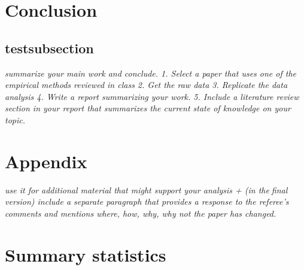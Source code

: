 \documentclass[11pt]{article}
\begin{document}
	\section{ Conclusion}
	\subsection{testsubsection}
	\textit{	summarize your main work and conclude.
		1. Select a paper that uses one of the empirical methods reviewed in class
		2. Get the raw data
		3. Replicate the data analysis
		4. Write a report summarizing your work.
		5. Include a literature review section in your report that summarizes the current state
		of knowledge on your topic.
	}

	
	
	\newpage
	
	\begin{subappendices}
		\appendix
		
		\section*{Appendix}\label{Appendix}
		\textit{use it for additional material that might support your analysis + (in thefinal version) include a separate paragraph that provides a response to the referee's comments and mentions where, how, why, why not the paper has changed.}
		\singlespacing
		\section{Summary statistics}\label{ASec:xxxxx}
		
		
	\end{subappendices}	
	
	
	
	\newpage
	{\footnotesize 
		
		\singlespacing
		
	}
	
	
\end{document}
